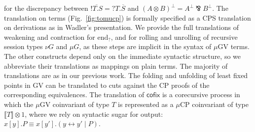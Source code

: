 \documentclass[orivec,envcountsame]{llncs}
\newcommand{\parr}{\mathbin\bindnasrepma}
\newcommand{\cpdual}[1]{#1^\perp}
\newcommand{\gvdual}[1]{\overline{#1}}
\newcommand{\gvout}[2]{{!#1.#2}}
\newcommand{\gvin}[2]{{?#1.#2}}
\newcommand{\lto}{\ensuremath{\multimap}}
\newcommand{\interm}{\mathrm{end}_?}
\newcommand{\gvtyp}[3]{#1 \vdash #2 : #3}
\newcommand{\mapname}{\mathsf{map}}
\newcommand{\map}[3]{\mapname^{#1}_{#2}(#3)}
\newcommand{\mkwd}[1]{\mathsf{#1}}
\newcommand{\link}[2]{#1 \leftrightarrow #2}
\newcommand{\cut}[4]{\mkwd{new}\:#1 \: (#3 \mid #4)}
\newcommand{\rec}[1]{\mkwd{rec}\:#1}
\newcommand{\corec}[5]{\mkwd{corec}\:#1 \langle #2 \rangle (#4,#5)}
\newcommand{\lrkwd}{\mkwd{cofix}}
\newcommand{\cofix}{\lrkwd}
\newcommand{\tocpbig}[1]{\left\llbracket #1 \right\rrbracket}
\newcommand{\tocp}[1]{\llbracket #1 \rrbracket}
\newcommand{\mucp}{$\mu\mathrm{CP}$\xspace}
\newcommand{\mugv}{$\mu\mathrm{GV}$\xspace}
\begin{document}
for the discrepancy between $\gvdual{\gvout{T}{S}} = \gvin{T}{\gvdual{S}}$ and $\cpdual{(A \otimes
  B)} = \cpdual{A} \parr \cpdual{B}.$
%
The translation on terms (Fig.~\ref{fig:tomucp}) is formally specified as a CPS translation on
derivations as in Wadler's presentation. We provide the full translations of weakening and
contraction for $\interm$, and for rolling and unrolling of recursive session types $\nu G$ and $\mu
G$, as these steps are implicit in the syntax of \mugv terms. The other constructs depend only on
the immediate syntactic structure, so we abbreviate their translations as mappings on plain
terms. The majority of translations are as in our previous work.  The folding and unfolding of least
fixed points in GV can be translated to cuts against the CP proofs of the corresponding
equivalences. The translation of $\cofix$ is a corecursive process in which the \mugv coinvariant of
type $T$ is represented as a \mucp coinvariant of type $\tocp{T} \otimes 1$, where we rely on
syntactic sugar for output: $x[y].P \equiv x[y'].(\link{y}{y'} \mid P)$.

%
%
\end{document}
